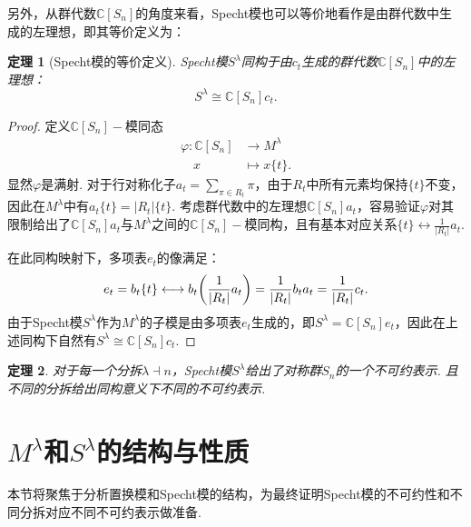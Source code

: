 \documentclass{sjtureport}
\newtheorem{theorem}{定理}[chapter]
\begin{document}
另外，从群代数$\mathbb{C}[S_n]$的角度来看，Specht模也可以等价地看作是由群代数中生成的左理想，即其等价定义为：
\begin{theorem}[Specht模的等价定义]
    Specht模$S^\lambda$同构于由$c_t$生成的群代数$\mathbb{C}[S_n]$中的左理想：
\begin{equation*}
    S^\lambda \cong \mathbb{C}[S_n]c_t.
\end{equation*}
\end{theorem}
\begin{proof}
    定义$\mathbb{C}[S_n]-\!$模同态
    \begin{equation*}
        \begin{aligned}
            \varphi: \mathbb{C}[S_n] &\to M^\lambda \\[-5pt]
            \quad x &\mapsto x\{t\}.
        \end{aligned}
    \end{equation*}
    显然$\varphi$是满射. 对于行对称化子$a_t=\sum_{\pi\in R_t}\pi$，由于$R_t$中所有元素均保持$\{t\}$不变，因此在$M^\lambda$中有$a_t\{t\} = |R_t|\{t\}$. 考虑群代数中的左理想$\mathbb{C}[S_n]a_t$，容易验证$\varphi$对其限制给出了$\mathbb{C}[S_n]a_t$与$M^\lambda$之间的$\mathbb{C}[S_n]-\!$模同构，且有基本对应关系$\{t\} \leftrightarrow \frac{1}{|R_t|}a_t$. 
    
    在此同构映射下，多项表$e_t$的像满足：
    \begin{equation*}
        e_t = b_t\{t\} \longleftrightarrow b_t\qty(\frac{1}{|R_t|}a_t) = \frac{1}{|R_t|}b_t a_t = \frac{1}{|R_t|}c_t.
    \end{equation*}
    由于Specht模$S^\lambda$作为$M^\lambda$的子模是由多项表$e_t$生成的，即$S^\lambda = \mathbb{C}[S_n]e_t$，因此在上述同构下自然有$S^\lambda \cong \mathbb{C}[S_n]c_t$.
\end{proof}



\begin{theorem}
    对于每一个分拆$\lambda \dashv n$，Specht模$S^\lambda$给出了对称群$S_n$的一个不可约表示. 且不同的分拆给出同构意义下不同的不可约表示.
\end{theorem}


\section{$M^\lambda$和$S^\lambda$的结构与性质}

本节将聚焦于分析置换模和Specht模的结构，为最终证明Specht模的不可约性和不同分拆对应不同不可约表示做准备.
\end{document}

